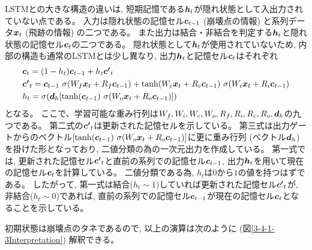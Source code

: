 LSTMとの大きな構造の違いは, 短期記憶である${\mbox{\boldmath{$h$}}}_t$が隠れ状態として入出力されていない点である。
入力は隠れ状態の記憶セル${\mbox{\boldmath{$c$}}}_{t-1}$ (崩壊点の情報) と系列データ${\mbox{\boldmath{$x$}}}_t$ (飛跡の情報) の二つである。
また出力は結合・非結合を判定する${\mbox{\boldmath{$h$}}}_t$と隠れ状態の記憶セル${\mbox{\boldmath{$c$}}}_{t}$の二つである。
隠れ状態として${\mbox{\boldmath{$h$}}}_t$が使用されていないため, 内部の構造も通常のLSTMとは少し異なり, 出力${\mbox{\boldmath{$h$}}}_{t}$と記憶セル${\mbox{\boldmath{$c$}}}_{t}$はそれぞれ
\begin{equation}
 \begin{split}
  &{\mbox{\boldmath{$c$}}}_{t} 
  = (1-h_t) {\mbox{\boldmath{$c$}}}_{t-1} + h_t {\mbox{\boldmath{$c'$}}}_{t}\\
  &{\mbox{\boldmath{$c'$}}}_{t}
  = {\mbox{\boldmath{$c$}}}_{t-1} \  \sigma (W_f {\mbox{\boldmath{$x$}}}_t + R_f {\mbox{\boldmath{$c$}}}_{t-1}) 
  + \tanh (W_c {\mbox{\boldmath{$x$}}}_t + R_c {\mbox{\boldmath{$c$}}}_{t-1}) \  \sigma (W_i {\mbox{\boldmath{$x$}}}_t + R_i {\mbox{\boldmath{$c$}}}_{t-1})\\
  &h_{t} 
  = \sigma ({\mbox{\boldmath{$d$}}}_h [\tanh({\mbox{\boldmath{$c$}}}_{t-1}) \  \sigma (W_o {\mbox{\boldmath{$x$}}}_t + R_o {\mbox{\boldmath{$c$}}}_{t-1}) ])
 \end{split}
\end{equation}
となる。
ここで、学習可能な重み行列は$W_f, W_i, W_c, W_o, R_f, R_i, R_c, R_o, {\mbox{\boldmath{$d$}}}_h$の九つである。
第二式の${\mbox{\boldmath{$c'$}}}_{t}$は更新された記憶セルを示している。
第三式は出力ゲートからのベクトル$[\tanh({\mbox{\boldmath{$c$}}}_{t-1}) \  \sigma (W_o {\mbox{\boldmath{$x$}}}_t + R_o {\mbox{\boldmath{$c$}}}_{t-1})]$に更に重み行列 (ベクトル${\mbox{\boldmath{$d$}}}_h$) を掛けた形となっており, 二値分類の為の一次元出力を作成している。
第一式では, 更新された記憶セル${\mbox{\boldmath{$c'$}}}_{t}$と直前の系列での記憶セル${\mbox{\boldmath{$c$}}}_{t-1}$, 出力${\mbox{\boldmath{$h$}}}_{t}$を用いて現在の記憶セル${\mbox{\boldmath{$c$}}}_{t}$を計算している。
二値分類である為, $h_{t}$は$0$から$1$の値を持つはずである。
したがって, 第一式は結合($h_{t} \sim 1$)していれば更新された記憶セル${\mbox{\boldmath{$c'$}}}_{t}$が, 非結合($h_{t} \sim 0$)であれば, 直前の系列での記憶セル${\mbox{\boldmath{$c$}}}_{t-1}$が現在の記憶セル${\mbox{\boldmath{$c$}}}_{t}$となることを示している。

初期状態は崩壊点のタネであるので, 以上の演算は次のように (図\ref{3-4-1-3Interpretation}) 解釈できる。

